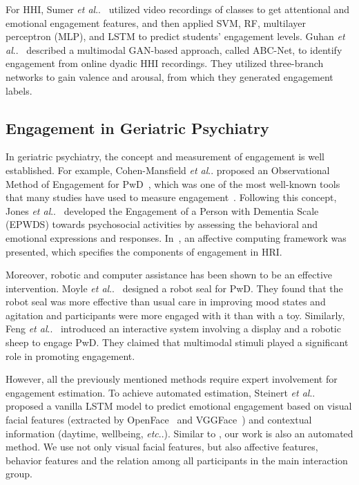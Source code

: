 \documentclass[twocolumn]{svjour3}
\makeatletter
\DeclareRobustCommand\onedot{\futurelet\@let@token\@onedot}
\def\@onedot{\ifx\@let@token.\else.\null\fi\xspace}
\def\etc{\emph{etc}\onedot} \def\vs{\emph{vs}\onedot}
\def\etal{\emph{et al}\onedot}
\makeatother
\begin{document}
For HHI, Sumer \etal~\cite{Sumer2021Multimodal} utilized video recordings of classes to get attentional and emotional engagement features, and then applied SVM, RF, multilayer perceptron (MLP), and LSTM to predict students' engagement levels. Guhan \etal~\cite{Guhan2020ABCNet} described a multimodal GAN-based approach, called ABC-Net, to identify engagement from online dyadic HHI recordings. They utilized three-branch networks to gain valence and arousal, from which they generated engagement labels.

\subsection{Engagement in Geriatric Psychiatry}
\label{subs:Engagement_for_the_Elderly}

In geriatric psychiatry, the concept and measurement of engagement is well established. For example, Cohen-Mansfield \etal proposed an Observational Method of Engagement for PwD~\cite{Cohen2009Engagement}, which was one of the most well-known tools that many studies have used to measure engagement~\cite{Trahan2014Systematic}. Following this concept, Jones \etal~\cite{Jones2018Engagement} developed the Engagement of a Person with Dementia Scale (EPWDS) towards psychosocial activities by assessing the behavioral and emotional expressions and responses. In~\cite{Perugia2020ENGAGEDEM}, an affective computing framework was presented, which specifies the components of engagement in HRI.

Moreover, robotic and computer assistance has been shown to be an effective intervention. Moyle \etal~\cite{Moyle2017Use} designed a robot seal for PwD. They found that the robot seal was more effective than usual care in improving mood states and agitation and participants were more engaged with it than with a toy. Similarly, Feng \etal~\cite{Feng2021ContextEnhanced} introduced an interactive system involving a display and a robotic sheep to engage PwD. They claimed that multimodal stimuli played a significant role in promoting engagement.

However, all the previously mentioned  methods require expert involvement for engagement estimation. To achieve automated estimation, Steinert \etal~\cite{Steinert2020Engagement} proposed a vanilla LSTM model to predict emotional engagement based on visual facial features (extracted by OpenFace~\cite{Baltrusaitis2018OpenFace} and VGGFace~\cite{Parkhi2015Deep}) and contextual information (daytime, wellbeing, \etc). Similar to \cite{Steinert2020Engagement}, our work is also an automated method. We use not only visual facial features, but also affective features, behavior features and the relation among all participants in the main interaction group.
\end{document}

